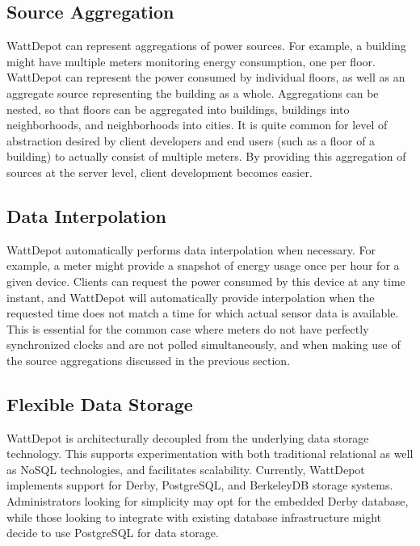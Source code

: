 \subsection{Source Aggregation}

WattDepot can represent aggregations of power sou\-rces. For example, a building might have multiple meters monitoring energy consumption, one per floor. WattDepot can represent the power consumed by individual floors, as well as an aggregate source representing the building as a whole. Aggregations can be nested, so that floors can be aggregated into buildings, buildings into neighborhoods, and neighborhoods into cities. It is quite common for level of abstraction desired by client developers and end users (such as a floor of a building) to actually consist of multiple meters. By providing this aggregation of sources at the server level, client development becomes easier.

\subsection{Data Interpolation}

WattDepot automatically performs data interpolation when necessary. For example, a meter might provide a snapshot of energy usage once per hour for a given device. Clients can request the power consumed by this device at any time instant, and WattDepot will automatically provide interpolation when the requested time does not match a time for which actual sensor data is available. This is essential for the common case where meters do not have perfectly synchronized clocks and are not polled simultaneously, and when making use of the source aggregations discussed in the previous section.

\subsection{Flexible Data Storage}

WattDepot is architecturally decoupled from the underlying data storage technology. This supports experimentation with both traditional relational as well as NoSQL technologies, and facilitates scalability. Currently, WattDepot implements support for Derby, PostgreSQL, and BerkeleyDB storage systems. Administrators looking for simplicity may opt for the embedded Derby database, while those looking to integrate with existing database infrastructure might decide to use PostgreSQL for data storage.

